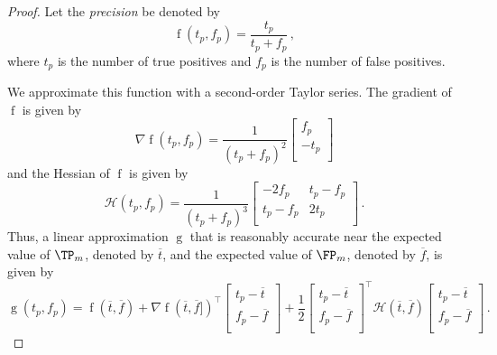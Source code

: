 \documentclass[ ../main.tex]{subfiles}
\begin{document}
\begin{proof}
Let the \emph{precision} be denoted by
\begin{equation}
    \operatorname{f}(t_p, f_p) = \frac{t_p}{t_p + f_p}\,,
\end{equation}
where $t_p$ is the number of true positives and $f_p$ is the number of false positives.

We approximate this function with a second-order Taylor series. The gradient of $\operatorname{f}$ is given by
\begin{equation}
    \nabla{\operatorname{f}}(t_p,f_p) =
    \frac{1}{(t_p + f_p)^2}
    \begin{bmatrix}
        f_p\\
        -t_p\\
    \end{bmatrix}
\end{equation}
and the Hessian of $\operatorname{f}$ is given by
\begin{equation}
    \mathcal{H}(t_p,f_p) =
    \frac{1}{(t_p + f_p)^3}
    \begin{bmatrix}
        -2 f_p & t_p-f_p\\
        t_p-f_p & 2 t_p \\
    \end{bmatrix}\,.
\end{equation}
Thus, a linear approximation $\operatorname{g}$ that is reasonably accurate near the expected value of $\TP_m$, denoted by $\overline{t}$, and the expected value of $\FP_m$, denoted by $\overline{f}$, is given by
\begin{equation}
    \operatorname{g}(t_p,f_p) =
    \operatorname{f}\left(\overline{t},\overline{f}\right) + \nabla{\operatorname{f}}(\overline{t},\overline{f}])^{\intercal}
    \begin{bmatrix}
        t_p - \overline{t}\\
        f_p - \overline{f}\\
    \end{bmatrix}
    + \frac{1}{2}
    \begin{bmatrix}
        t_p - \overline{t}\\
        f_p - \overline{f}\\
    \end{bmatrix}^{\intercal}
    \mathcal{H}(\overline{t},\overline{f})
    \begin{bmatrix}
        t_p - \overline{t}\\
        f_p - \overline{f}\\
    \end{bmatrix}\,.

\end{equation}
\end{proof}
\end{document}
